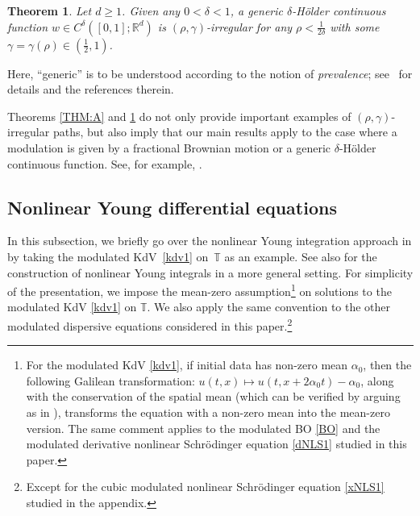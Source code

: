 \documentclass[letterpaper, 11pt,  reqno]{amsart}
\newtheorem{oldtheorem}{Theorem}
\newcommand{\1}{\hspace{0.5mm}\text{I}\hspace{0.5mm}}
\newcommand{\R}{\mathbb{R}}
\newcommand{\T}{\mathbb{T}}
\newcommand{\al}{\alpha}
\newcommand{\dl}{\delta}
\newcommand{\g}{\gamma}
\numberwithin{equation}{section}
\numberwithin{theorem}{section}
\begin{document}
\begin{oldtheorem}
\label{THM:B}
Let  $d \ge 1$.
Given  any $0 < \delta < 1$, 
a generic $\dl$-H\"older continuous  function $w \in C^\delta([0,1];\R^d)$ 
 is $(\rho,\g)$-irregular for any $\rho < \frac1{2\delta}$ with  some $\gamma = \gamma(\rho) \in (\frac 12,1)$.
\end{oldtheorem}


Here, ``generic'' is to be understood according to the notion of {\it prevalence}; see~\cite{GG} for details and the  references therein.




Theorems \ref{THM:A} and \ref{THM:B}
do not only provide important examples of $(\rho, \g)$-irregular paths, 
but also imply that 
 our main results
apply 
to the case
where a modulation is given by a fractional Brownian motion
or a generic  $\dl$-H\"older continuous function.
See, for example, \cite[Corollary~1.5]{CGLLO1}.









\subsection{Nonlinear Young differential equations}
\label{SUBSEC:YDE}





In this subsection, 
we briefly go over the nonlinear Young integration approach
in \cite{CGLLO1}
by taking the modulated 
 KdV~\eqref{kdv1} on~$\T$
 as an example.
See also \cite{HK, G23}
for the construction of nonlinear Young integrals in a more general setting.
For simplicity of the presentation, 
we impose
the mean-zero assumption\footnote{For the modulated KdV \eqref{kdv1}, 
if initial data has non-zero mean $\al_0$, then the following Galilean transformation:
$u(t, x)\mapsto u (t, x + 2\al_0t)-\al_0$, 
along with the conservation of the spatial mean (which can be verified
by arguing as in \cite[Section 6]{CGLLO1}), 
transforms
the equation with a non-zero mean into the mean-zero version.
The same comment applies
to the modulated BO \eqref{BO} and the modulated derivative nonlinear
Schr\"odinger equation \eqref{dNLS1}
studied in this paper.
}
 on solutions to
the modulated KdV \eqref{kdv1}
on $\T$.
We also apply the same convention
to  the other modulated dispersive equations 
considered in this paper.\footnote{Except for the cubic modulated nonlinear Schr\"odinger equation
\eqref{xNLS1}
studied in the appendix.}
\end{document}
